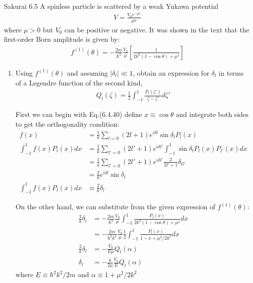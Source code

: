 \documentclass{article}
\begin{document}
\begin{section}{Sakurai 6.5}
A spinless particle is scattered by a weak Yukawa potential
\begin{align*}
	V = \frac{V_0 e^{-\mu r}}{\mu r}
\end{align*}
where $\mu > 0$ but $V_0$ can be positive or negative. It was shown in the text that the first-order Born amplitude is given by:
\begin{align*}
	f^{(1)}(\theta) = -\frac{2m}{\hbar^2} \frac{V_0}{\mu} \left[ \frac{1}{2k^2 (1-\cos\theta) + \mu^2}\right]
\end{align*}
\begin{enumerate}
	\item Using $f^{(1)}(\theta)$ and assuming $|\delta_l| \ll 1$, obtain an expression for $\delta_l$ in terms of a Legendre function of the second kind,
	\begin{align*}
		Q_l(\zeta) = \frac{1}{2} \int_{-1}^{1} \frac{P_l(\zeta')}{\zeta - \zeta'} d\zeta'
	\end{align*}

	\begin{tcolorbox}[breakable]
		First we can begin with Eq.(6.4.40) define $x \equiv \cos\theta$ and integrate both sides to get the orthogonality condition:
		\begin{align*}
			f(x)                         & = \frac{1}{k} \sum_{l=0} (2l+1) e^{i\delta l} \sin\delta_l P_l(x)                               \\
			\int_{-1}^{1} f(x) P_l(x) dx & = \frac{1}{k} \sum_{l'=0} (2l'+1) e^{i\delta l'} \int_{-1}^{1} \sin\delta_l P_l(x) P_{l'}(x) dx \\
			                             & = \frac{1}{k} \sum_{l'=0} (2l'+1) e^{i\delta l'} \frac{2}{2l'+1} \delta_{ll'}                   \\
			                             & = \frac{2}{k}  e^{i\delta l} \sin\delta_l                                                       \\
			\int_{-1}^{1} f(x) P_l(x) dx & \approx \frac{2}{k} \delta_l
		\end{align*}

		On the other hand, we can substitute from the given expression of $f^{(1)}(\theta)$:
		\begin{align*}
			\frac{2}{k} \delta_l & = -\frac{2m}{\hbar^2} \frac{V_0}{\mu} \int_{-1}^{1}  \frac{P_l(x)}{2k^2 (1-\cos\theta) + \mu^2} dx      \\
			                     & = -\frac{2m}{\hbar^2 k^2} \frac{V_0}{\mu} \frac{1}{2} \int_{-1}^{1}  \frac{P_l(x)}{1-x + \mu^2/2k^2} dx \\
			\frac{2}{k} \delta_l & = -\frac{V_0}{E\mu} Q_l(\alpha)                                                                         \\
			\delta_l             & = -\frac{k}{2\mu} \frac{V_0}{E} Q_l(\alpha)
		\end{align*}
		where $E \equiv \hbar^2k^2/2m$ and $\alpha \equiv 1 + \mu^2/2k^2$
	\end{tcolorbox}


\end{enumerate}
\end{section}
\end{document}
